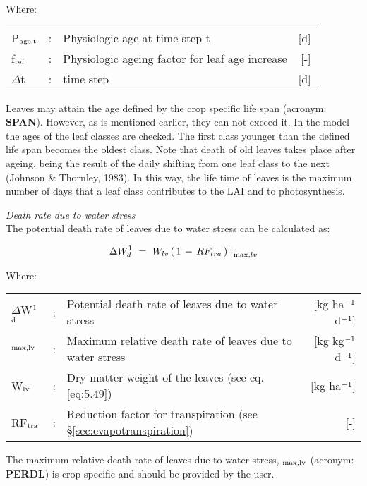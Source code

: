 Where:\\[5pt]
\begin{tabularx}{\textwidth}{llXr}
	P$_{{\rm age,t}}$ &:& Physiologic age at time step t & [d]\\
	f$_{{\rm rai}}$ &:& Physiologic ageing factor for leaf age increase & [-]\\
	$\Delta$t &:& time step & [d]\\
\end{tabularx}

Leaves may attain the age defined by the crop specific life span (acronym: {\bf SPAN}).
However, as is mentioned earlier, they can not exceed it. In the model the ages of the
leaf classes are checked. The first class younger than the defined life span becomes the
oldest class. Note that death of old leaves takes place after ageing, being the result of the
daily shifting from one leaf class to the next (Johnson \& Thornley, 1983). In this way,
the life time of leaves is the maximum number of days that a leaf class contributes to the
LAI and to photosynthesis.

{\it Death rate due to water stress}\\
The potential death rate of leaves due to water stress can be calculated as:

\begin{equation}
\Delta W_{d}^{1} ~=~ W_{lv} \, (\, 1\, -\,RF_{tra} \, )\, {\rm \dag } _{\max ,lv} 
\end{equation}

Where:\\[5pt]
\begin{tabularx}{\textwidth}{llXr}
	$\Delta$W$^{{\rm 1}}$$_{{\rm d}}$ &:& Potential death rate of leaves due to water stress   &
	[kg  ha$^{{\rm -1}}$ d$^{{\rm -1}}$]\\
	\dag $_{{\rm max,lv}}$ &:& Maximum relative death rate of leaves due to
	water stress   &     [kg kg$^{{\rm -1}}$ d$^{{\rm -1}}$]\\
	W$_{{\rm lv}}$ &:& Dry matter weight of the leaves (see eq. \ref{eq:5.49})  &
	[kg ha$^{{\rm -1}}$]\\
	RF$_{{\rm tra}}$ &:& Reduction factor for transpiration (see \S \ref{sec:evapotranspiration})    &
	[-]\\
\end{tabularx}

The maximum relative death rate of leaves due to water stress, {\bf \dag $_{{\rm max,lv}}$} 
(acronym: {\bf PERDL}) is crop specific and should be provided by the user.

